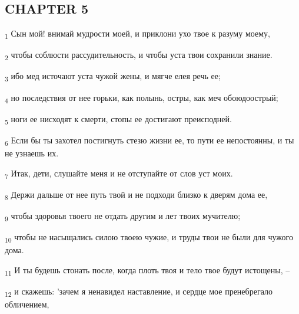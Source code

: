 \subsection{CHAPTER 5}
\begin{tcolorbox}
\textsubscript{1} Сын мой! внимай мудрости моей, и приклони ухо твое к разуму моему,
\end{tcolorbox}
\begin{tcolorbox}
\textsubscript{2} чтобы соблюсти рассудительность, и чтобы уста твои сохранили знание.
\end{tcolorbox}
\begin{tcolorbox}
\textsubscript{3} ибо мед источают уста чужой жены, и мягче елея речь ее;
\end{tcolorbox}
\begin{tcolorbox}
\textsubscript{4} но последствия от нее горьки, как полынь, остры, как меч обоюдоострый;
\end{tcolorbox}
\begin{tcolorbox}
\textsubscript{5} ноги ее нисходят к смерти, стопы ее достигают преисподней.
\end{tcolorbox}
\begin{tcolorbox}
\textsubscript{6} Если бы ты захотел постигнуть стезю жизни ее, то пути ее непостоянны, и ты не узнаешь их.
\end{tcolorbox}
\begin{tcolorbox}
\textsubscript{7} Итак, дети, слушайте меня и не отступайте от слов уст моих.
\end{tcolorbox}
\begin{tcolorbox}
\textsubscript{8} Держи дальше от нее путь твой и не подходи близко к дверям дома ее,
\end{tcolorbox}
\begin{tcolorbox}
\textsubscript{9} чтобы здоровья твоего не отдать другим и лет твоих мучителю;
\end{tcolorbox}
\begin{tcolorbox}
\textsubscript{10} чтобы не насыщались силою твоею чужие, и труды твои не были для чужого дома.
\end{tcolorbox}
\begin{tcolorbox}
\textsubscript{11} И ты будешь стонать после, когда плоть твоя и тело твое будут истощены, --
\end{tcolorbox}
\begin{tcolorbox}
\textsubscript{12} и скажешь: 'зачем я ненавидел наставление, и сердце мое пренебрегало обличением,
\end{tcolorbox}
